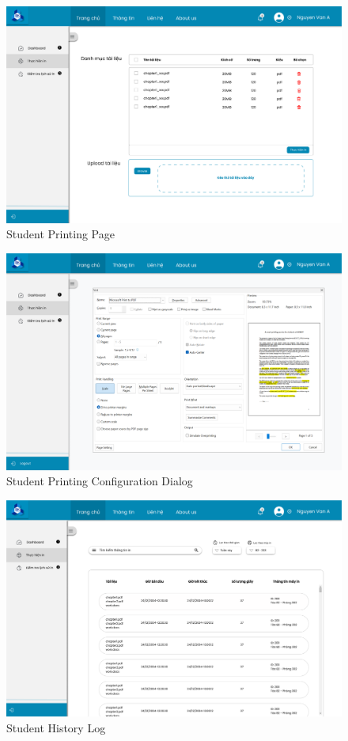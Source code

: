 \documentclass[a4paper]{report}
\begin{document}
\begin{figure}[H]
    \centering
    \includegraphics[width = \textwidth, ]{images/UI/Bảng in sinh viên.png}
    \caption{Student Printing Page}
\end{figure}  

\begin{figure}[H]
    \centering
    \includegraphics[width = \textwidth, ]{images/UI/Bảng in sinh viên 2.png}
    \caption{Student Printing Configuration Dialog}
\end{figure}  

\begin{figure}[H]
    \centering
    \includegraphics[width = \textwidth, ]{images/UI/Tra lịch sử sinh viên.png}
    \caption{Student History Log}
\end{figure}  
\end{document}
